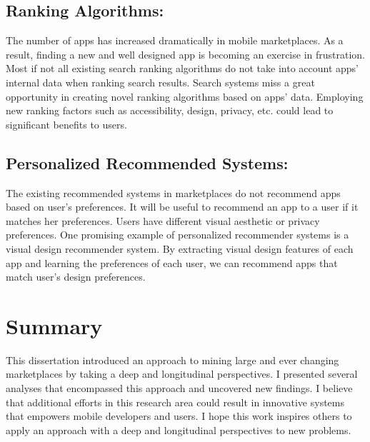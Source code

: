 \subsection*{Ranking Algorithms:}
The number of apps has increased dramatically in mobile marketplaces.
As a result, finding a new and well designed app is becoming an exercise in frustration.
Most if not all existing search ranking algorithms do not take into account apps' internal data when ranking search results.
Search systems miss a great opportunity in creating novel ranking algorithms based on apps' data.
Employing new ranking factors such as accessibility, design, privacy, etc. could lead to significant benefits to users.

\subsection*{Personalized Recommended Systems:}
The existing recommended systems in marketplaces do not recommend apps based on user's preferences.
It will be useful to recommend an app to a user if it matches her preferences.
Users have different visual aesthetic or privacy preferences.
One promising example of personalized recommender systems is a visual design recommender system.
By extracting visual design features of each app and learning the preferences of each user, we can recommend apps that match user's design preferences.

\section{Summary}
This dissertation introduced an approach to mining large and ever changing marketplaces by taking a deep and longitudinal perspectives.
I presented several analyses that encompassed this approach and uncovered new findings.
I believe that additional efforts in this research area could result in innovative systems that empowers mobile developers and users.
I hope this work inspires others to apply an approach with a deep and longitudinal perspectives to new problems.